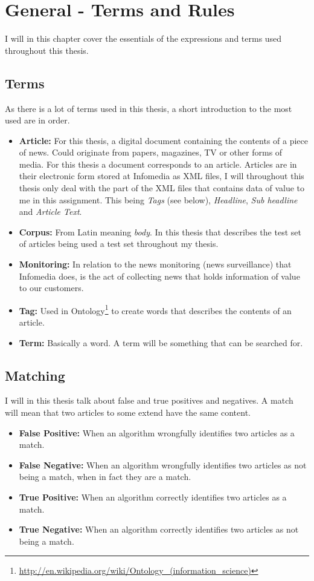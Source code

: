 \chapter{General - Terms and Rules}

I will in this chapter cover the essentials of the expressions and terms used throughout this thesis.

\section{Terms}

As there is a lot of terms used in this thesis, a short introduction to the most used are in order.
\begin{itemize}
\item \textbf{Article:} For this thesis, a digital document containing the contents of a piece of news. Could originate from papers, magazines, TV or other forms of media. For this thesis a document corresponds to an article. Articles are in their electronic form stored at Infomedia as XML files, I will throughout this thesis only deal with the part of the XML files that contains data of value to me in this assignment. This being \textit{Tags} (see below), \textit{Headline}, \textit{Sub headline} and \textit{Article Text}.
\item \textbf{Corpus:} From Latin meaning \textit{body}. In this thesis that describes the test set of articles being used a test set throughout my thesis.
\item \textbf{Monitoring:} In relation to the news monitoring (news surveillance) that Infomedia does, is the act of collecting news that holds information of value to our customers.
\item \textbf{Tag:} Used in Ontology\footnote{\url{http://en.wikipedia.org/wiki/Ontology_(information_science)}} to create words that describes the contents of an article.
\item \textbf{Term:} Basically a word. A term will be something that can be searched for.
\end{itemize}

\section{Matching}
I will in this thesis talk about false and true positives and negatives. A match will mean that two articles to some extend have the same content.

\begin{itemize}
\item \textbf{False Positive:} When an algorithm wrongfully identifies two articles as a match.
\item \textbf{False Negative:} When an algorithm wrongfully identifies two articles as not being a match, when in fact they are a match.
\item \textbf{True Positive:} When an algorithm correctly identifies two articles as a match.
\item \textbf{True Negative:} When an algorithm correctly identifies two articles as not being a match.
\end{itemize}


